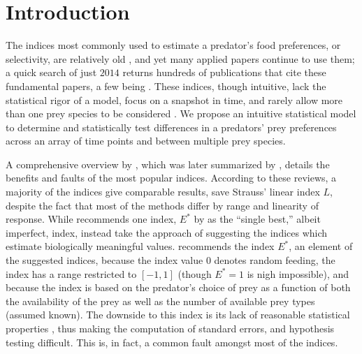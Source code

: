 \section{Introduction}
\label{sec:intro}

The indices most commonly used to estimate a predator's food preferences, or selectivity, are relatively old \citep{Ivlev:1964,Jacobs:1974,Chesson:1978,Strauss:1979,Vanderploeg:1979,Chesson:1983}, and yet many applied papers continue to use them; a quick search of just $2014$ returns hundreds of publications that cite these fundamental papers, a few being \citet{Clements:2014,Hansen:2014,Hellstrom:2014,Lyngdoh:2014,Madduppa:2014}.  These indices, though intuitive, lack the statistical rigor of a model, focus on a snapshot in time, and rarely allow more than one prey species to be considered \citep{Lechowicz:1982}.  We propose an intuitive statistical model to determine and statistically test differences in a predators' prey preferences across an array of time points and between multiple prey species.   

A comprehensive overview by \citet{Lechowicz:1982}, which was later summarized by \citet{Manly:1992}, details the benefits and faults of the most popular indices.  According to these reviews, a majority of the indices give comparable results, save Strauss' linear index $L$, despite the fact that most of the methods differ by range and linearity of response.  While \citet{Lechowicz:1982} recommends one index, $E^*$ by \citet{Vanderploeg:1979} as the ``single best,'' albeit imperfect, index, \citet{Manly:1992} instead take the approach of suggesting the indices which  estimate biologically meaningful values.  \citet{Lechowicz:1982} recommends the index $E^*$, an element of the \citet{Manly:1992} suggested indices, because the index value $0$ denotes random feeding, the index has a range restricted to $[-1,1]$ (though $E^*=1$ is nigh impossible), and because the index is based on the predator's choice of prey as a function of both the availability of the prey as well as the number of available prey types (assumed known).  The downside to this index is its lack of reasonable statistical properties \citep{Lechowicz:1982}, thus making the computation of standard errors, and hypothesis testing difficult.  This is, in fact, a common fault amongst most of the indices.  

